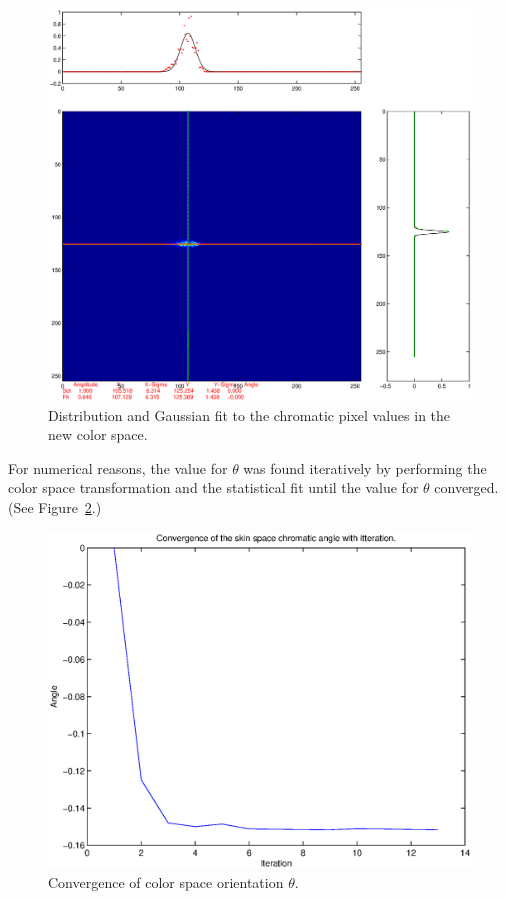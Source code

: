 \begin{figure}[h!]
  \caption{Distribution and Gaussian fit to the chromatic pixel values in the new color space.}
  \label{fig:DistributionAndGaussianFit}
  \centering
    \includegraphics[width=\textwidth]{Chapter2/Figs/crosshairFigureFinal.eps}
\end{figure}


For numerical reasons, the value for $\theta$ was found iteratively by performing the color space transformation and the statistical fit until the value for $\theta$ converged. (See Figure~\ref{fig:ConvergenceTheta}.)


\begin{figure}[h!]
  \caption{Convergence of color space orientation $\theta$.}
  \label{fig:ConvergenceTheta}
  \centering
    \includegraphics[width=\textwidth]{Chapter2/Figs/ConvergenceOfSkinSpaceFinal.eps}
\end{figure}


